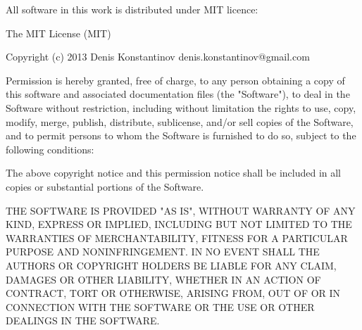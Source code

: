 All software in this work is distributed under MIT licence:

The MIT License (MIT)

Copyright (c) 2013 Denis Konstantinov denis.konstantinov@gmail.com

Permission is hereby granted, free of charge, to any person obtaining a copy
of this software and associated documentation files (the "Software"), to deal
in the Software without restriction, including without limitation the rights
to use, copy, modify, merge, publish, distribute, sublicense, and/or sell
copies of the Software, and to permit persons to whom the Software is
furnished to do so, subject to the following conditions:

The above copyright notice and this permission notice shall be included in
all copies or substantial portions of the Software.

THE SOFTWARE IS PROVIDED "AS IS", WITHOUT WARRANTY OF ANY KIND, EXPRESS OR
IMPLIED, INCLUDING BUT NOT LIMITED TO THE WARRANTIES OF MERCHANTABILITY,
FITNESS FOR A PARTICULAR PURPOSE AND NONINFRINGEMENT. IN NO EVENT SHALL THE
AUTHORS OR COPYRIGHT HOLDERS BE LIABLE FOR ANY CLAIM, DAMAGES OR OTHER
LIABILITY, WHETHER IN AN ACTION OF CONTRACT, TORT OR OTHERWISE, ARISING FROM,
OUT OF OR IN CONNECTION WITH THE SOFTWARE OR THE USE OR OTHER DEALINGS IN
THE SOFTWARE.
